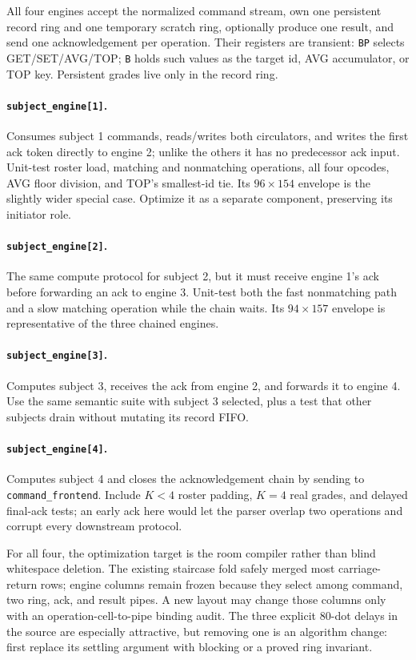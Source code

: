 \documentclass[11pt,a4paper]{article}
\newcommand{\op}[1]{\texttt{#1}}
\begin{document}
All four engines accept the normalized command stream, own one persistent
record ring and one temporary scratch ring, optionally produce one result,
and send one acknowledgement per operation. Their registers are transient:
\op{BP} selects GET/SET/AVG/TOP; \op{B} holds such values as the target id,
AVG accumulator, or TOP key. Persistent grades live only in the record ring.

\paragraph{\texttt{subject\_engine[1]}.}
Consumes subject 1 commands, reads/writes both circulators, and writes the
first ack token directly to engine 2; unlike the others it has no predecessor
ack input. Unit-test roster load, matching and nonmatching operations, all
four opcodes, AVG floor division, and TOP's smallest-id tie. Its
$96\times154$ envelope is the slightly wider special case. Optimize it as a
separate component, preserving its initiator role.

\paragraph{\texttt{subject\_engine[2]}.}
The same compute protocol for subject 2, but it must receive engine 1's ack
before forwarding an ack to engine 3. Unit-test both the fast nonmatching
path and a slow matching operation while the chain waits. Its
$94\times157$ envelope is representative of the three chained engines.

\paragraph{\texttt{subject\_engine[3]}.}
Computes subject 3, receives the ack from engine 2, and forwards it to engine
4. Use the same semantic suite with subject 3 selected, plus a test that
other subjects drain without mutating its record FIFO.

\paragraph{\texttt{subject\_engine[4]}.}
Computes subject 4 and closes the acknowledgement chain by sending to
\texttt{command\_frontend}. Include $K<4$ roster padding, $K=4$ real grades,
and delayed final-ack tests; an early ack here would let the parser overlap
two operations and corrupt every downstream protocol.

For all four, the optimization target is the room compiler rather than
blind whitespace deletion. The existing staircase fold safely merged most
carriage-return rows; engine columns remain frozen because they select among
command, two ring, ack, and result pipes. A new layout may change those
columns only with an operation-cell-to-pipe binding audit. The three explicit
80-dot delays in the source are especially attractive, but removing one is
an algorithm change: first replace its settling argument with blocking or a
proved ring invariant.
\end{document}
